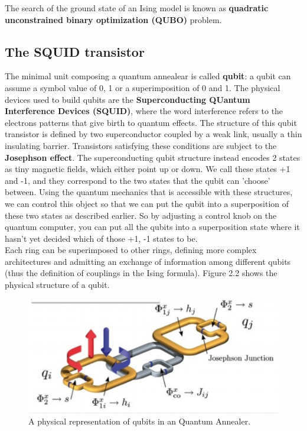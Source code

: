 The search of the ground state of an Ising model is known as \textbf{quadratic unconstrained binary optimization (QUBO)} problem. \\

\subsection{The SQUID transistor}

 The minimal unit composing a quantum annealear is called \textbf{qubit}: a qubit can assume a symbol value of 0, 1 or a superimposition of 0 and 1. The physical devices used to build qubits are the \textbf{Superconducting QUantum Interference Devices (SQUID)}, where the word interference refers to the electrons patterns that give birth to quantum effects. The structure of this qubit transistor is defined by two superconductor coupled by a weak link, usually a thin insulating barrier. Transistors satisfying these conditions are subject to the \textbf{Josephson effect}. The superconducting qubit structure instead encodes 2 states as tiny magnetic fields, which either point up or down. We call these states +1 and -1, and they correspond to the two states that the qubit can 'choose' between. Using the quantum mechanics that is accessible with these structures, we can control this object so that we can put the qubit into a superposition of these two states as described earlier. So by adjusting a control knob on the quantum computer, you can put all the qubits into a superposition state where it hasn't yet decided which of those +1, -1 states to be.\\
  Each ring can be superimposed to other rings, defining more complex architectures and admitting an exchange of information among different qubits (thus the definition of couplings in the Ising formula). Figure 2.2 shows the physical structure of a qubit.\\
  
  \begin{figure}[t]
	\begin{center}
	\includegraphics{images/QA.PNG}
	\caption{A physical representation of qubits in an Quantum Annealer.}
	\end{center}
\end{figure}

